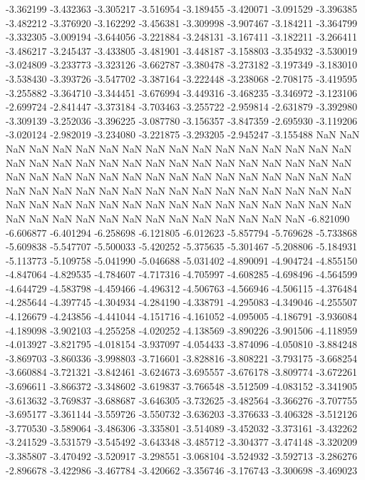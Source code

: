 -3.362199
-3.432363
-3.305217
-3.516954
-3.189455
-3.420071
-3.091529
-3.396385
-3.482212
-3.376920
-3.162292
-3.456381
-3.309998
-3.907467
-3.184211
-3.364799
-3.332305
-3.009194
-3.644056
-3.221884
-3.248131
-3.167411
-3.182211
-3.266411
-3.486217
-3.245437
-3.433805
-3.481901
-3.448187
-3.158803
-3.354932
-3.530019
-3.024809
-3.233773
-3.323126
-3.662787
-3.380478
-3.273182
-3.197349
-3.183010
-3.538430
-3.393726
-3.547702
-3.387164
-3.222448
-3.238068
-2.708175
-3.419595
-3.255882
-3.364710
-3.344451
-3.676994
-3.449316
-3.468235
-3.346972
-3.123106
-2.699724
-2.841447
-3.373184
-3.703463
-3.255722
-2.959814
-2.631879
-3.392980
-3.309139
-3.252036
-3.396225
-3.087780
-3.156357
-3.847359
-2.695930
-3.119206
-3.020124
-2.982019
-3.234080
-3.221875
-3.293205
-2.945247
-3.155488
NaN
NaN
NaN
NaN
NaN
NaN
NaN
NaN
NaN
NaN
NaN
NaN
NaN
NaN
NaN
NaN
NaN
NaN
NaN
NaN
NaN
NaN
NaN
NaN
NaN
NaN
NaN
NaN
NaN
NaN
NaN
NaN
NaN
NaN
NaN
NaN
NaN
NaN
NaN
NaN
NaN
NaN
NaN
NaN
NaN
NaN
NaN
NaN
NaN
NaN
NaN
NaN
NaN
NaN
NaN
NaN
NaN
NaN
NaN
NaN
NaN
NaN
NaN
NaN
NaN
NaN
NaN
NaN
NaN
NaN
NaN
NaN
NaN
NaN
NaN
NaN
NaN
NaN
NaN
NaN
NaN
NaN
NaN
NaN
NaN
NaN
NaN
NaN
NaN
NaN
-6.821090
-6.606877
-6.401294
-6.258698
-6.121805
-6.012623
-5.857794
-5.769628
-5.733868
-5.609838
-5.547707
-5.500033
-5.420252
-5.375635
-5.301467
-5.208806
-5.184931
-5.113773
-5.109758
-5.041990
-5.046688
-5.031402
-4.890091
-4.904724
-4.855150
-4.847064
-4.829535
-4.784607
-4.717316
-4.705997
-4.608285
-4.698496
-4.564599
-4.644729
-4.583798
-4.459466
-4.496312
-4.506763
-4.566946
-4.506115
-4.376484
-4.285644
-4.397745
-4.304934
-4.284190
-4.338791
-4.295083
-4.349046
-4.255507
-4.126679
-4.243856
-4.441044
-4.151716
-4.161052
-4.095005
-4.186791
-3.936084
-4.189098
-3.902103
-4.255258
-4.020252
-4.138569
-3.890226
-3.901506
-4.118959
-4.013927
-3.821795
-4.018154
-3.937097
-4.054433
-3.874096
-4.050810
-3.884248
-3.869703
-3.860336
-3.998803
-3.716601
-3.828816
-3.808221
-3.793175
-3.668254
-3.660884
-3.721321
-3.842461
-3.624673
-3.695557
-3.676178
-3.809774
-3.672261
-3.696611
-3.866372
-3.348602
-3.619837
-3.766548
-3.512509
-4.083152
-3.341905
-3.613632
-3.769837
-3.688687
-3.646305
-3.732625
-3.482564
-3.366276
-3.707755
-3.695177
-3.361144
-3.559726
-3.550732
-3.636203
-3.376633
-3.406328
-3.512126
-3.770530
-3.589064
-3.486306
-3.335801
-3.514089
-3.452032
-3.373161
-3.432262
-3.241529
-3.531579
-3.545492
-3.643348
-3.485712
-3.304377
-3.474148
-3.320209
-3.385807
-3.470492
-3.520917
-3.298551
-3.068104
-3.524932
-3.592713
-3.286276
-2.896678
-3.422986
-3.467784
-3.420662
-3.356746
-3.176743
-3.300698
-3.469023
